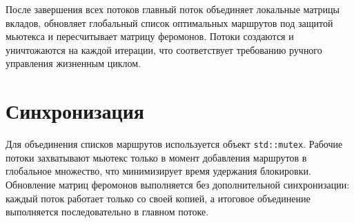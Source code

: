 После завершения всех потоков главный поток объединяет локальные матрицы вкладов, обновляет
глобальный список оптимальных маршрутов под защитой мьютекса и пересчитывает матрицу
феромонов. Потоки создаются и уничтожаются на каждой итерации, что соответствует требованию
ручного управления жизненным циклом.

\section*{Синхронизация}
Для объединения списков маршрутов используется объект \texttt{std::mutex}. Рабочие потоки
захватывают мьютекс только в момент добавления маршрутов в глобальное множество, что
минимизирует время удержания блокировки. Обновление матриц феромонов выполняется без
дополнительной синхронизации: каждый поток работает только со своей копией, а итоговое
объединение выполняется последовательно в главном потоке.

\clearpage
